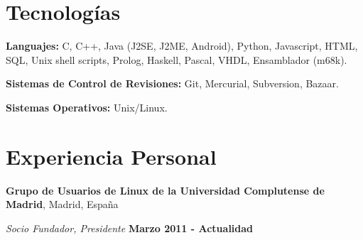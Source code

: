 \documentclass[margin,line]{resume}
\begin{document}
\begin{resume}
\section{\sc Tecnologías} 
\begin{list1}
\item[]{\bf Languajes:} C, C++, Java (J2SE, J2ME, Android), Python,
Javascript, HTML, SQL, Unix shell scripts, Prolog, Haskell, Pascal, VHDL,
Ensamblador (m68k).
\item[]{\bf Sistemas de Control de Revisiones:} Git, Mercurial, Subversion, Bazaar.
\item[]{\bf Sistemas Operativos:} Unix/Linux.
\end{list1}

\section{\sc Experiencia Personal}
{\bf Grupo de Usuarios de Linux de la Universidad Complutense de
Madrid}, Madrid, España

\vspace{-.3cm}
{\em Socio Fundador, Presidente} \hfill {\bf Marzo 2011 - Actualidad}






%

\end{resume}
\end{document}
